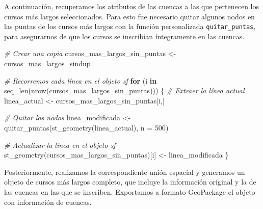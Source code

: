 \documentclass[spanish]{article}
\newenvironment{Shaded}{\begin{snugshade}}{\end{snugshade}}
\newcommand{\AttributeTok}[1]{\textcolor[rgb]{0.77,0.63,0.00}{#1}}
\newcommand{\CommentTok}[1]{\textcolor[rgb]{0.56,0.35,0.01}{\textit{#1}}}
\newcommand{\ControlFlowTok}[1]{\textcolor[rgb]{0.13,0.29,0.53}{\textbf{#1}}}
\newcommand{\DecValTok}[1]{\textcolor[rgb]{0.00,0.00,0.81}{#1}}
\newcommand{\FunctionTok}[1]{\textcolor[rgb]{0.00,0.00,0.00}{#1}}
\newcommand{\NormalTok}[1]{#1}
\newcommand{\OtherTok}[1]{\textcolor[rgb]{0.56,0.35,0.01}{#1}}
\begin{document}
A continuación, recuperamos los atributos de las cuencas a las que
pertenecen los cursos más largos seleccionados. Para esto fue necesario
quitar algunos nodos en las puntas de los cursos más largos con la
función personalizada \texttt{quitar\_puntas}, para asegurarnos de que
los cursos se inscribían íntegramente en las cuencas.

\begin{Shaded}
\begin{Highlighting}[]
\CommentTok{\# Crear una copia}
\NormalTok{cursos\_mas\_largos\_sin\_puntas }\OtherTok{\textless{}{-}}\NormalTok{ cursos\_mas\_largos\_sindup}

\CommentTok{\# Recorremos cada línea en el objeto sf}
\ControlFlowTok{for}\NormalTok{ (i }\ControlFlowTok{in} \FunctionTok{seq\_len}\NormalTok{(}\FunctionTok{nrow}\NormalTok{(cursos\_mas\_largos\_sin\_puntas))) \{}
  \CommentTok{\# Extraer la línea actual}
\NormalTok{  linea\_actual }\OtherTok{\textless{}{-}}\NormalTok{ cursos\_mas\_largos\_sin\_puntas[i,]}
  
  \CommentTok{\# Quitar los nodos}
\NormalTok{  linea\_modificada }\OtherTok{\textless{}{-}} \FunctionTok{quitar\_puntas}\NormalTok{(}\FunctionTok{st\_geometry}\NormalTok{(linea\_actual), }\AttributeTok{n =} \DecValTok{500}\NormalTok{)}
  
  \CommentTok{\# Actualizar la línea en el objeto sf}
  \FunctionTok{st\_geometry}\NormalTok{(cursos\_mas\_largos\_sin\_puntas)[i] }\OtherTok{\textless{}{-}}\NormalTok{ linea\_modificada}
\NormalTok{\}}
\end{Highlighting}
\end{Shaded}

Posteriormente, realizamos la correspondiente unión espacial y generamos
un objeto de cursos más largos completo, que incluye la información
original y la de las cuencas en las que se inscriben. Exportamos a
formato GeoPackage el objeto con información de cuencas.
\end{document}
